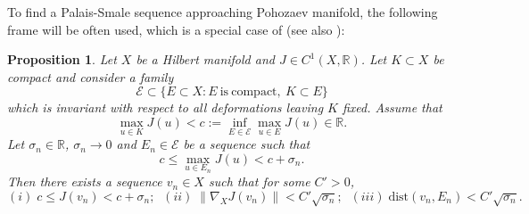 \documentclass[10pt]{article}
\numberwithin{equation}{section}
\newtheorem{proposition}[theorem]{Proposition}
\numberwithin{equation}{section}
\begin{document}
To find a Palais-Smale sequence approaching Pohozaev manifold, the following frame will be often used, which is a special case of \cite[Theorem 4.5]{Ghoussoub1993} (see also \cite[Lemma 3.1]{BMRV2021}):
\begin{proposition}\label{22072013}
Let $X$ be a Hilbert manifold and $J\in C^1(X,\mathbb{R})$. Let $K\subset X$ be compact and consider a family
\[
\mathcal{E}\subset \{E\subset X: E ~\text{is}~ \text{compact},~K\subset E \}
\]
which is invariant with respect to all deformations leaving $K$ fixed. Assume that
\[
\underset{u\in K}{\max}J(u)<c:=\underset{E\in \mathcal{E}}{\inf}\underset{u\in E}{\max}J(u)\in \mathbb{R}.
\]
Let $\sigma_n\in \mathbb{R}$, $\sigma_n\to 0$ and $E_n\in \mathcal{E}$ be a sequence such that
\[
c\le \underset{u\in E_n}{\max} J(u)<c+\sigma_n.
\]
Then there exists a sequence $v_n\in X$ such that for some $C'>0$,
$$ (i)\;  c\le J(v_n) <c+\sigma_n; \;\; (ii)\;  \|\nabla_{X}J(v_n)\|< C' \sqrt{\sigma_n}; \;\; (iii) \; \text{dist}(v_n, E_n)< C'\sqrt{\sigma_n}.$$
\end{proposition}
\end{document}
